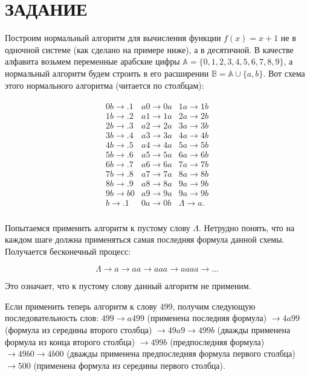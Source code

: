 \documentclass{article}
\begin{document}
\section*{ЗАДАНИЕ}
Построим нормальный алгоритм для вычисления функции \( f(x) = x + 1 \) не в одночной системе (как сделано на примере ниже), а в десятичной. В качестве алфавита возьмем переменные арабские цифры \( \mathbb{A} = \{0, 1, 2, 3, 4, 5, 6, 7, 8, 9\} \), а нормальный алгоритм будем строить в его расширении \( \mathbb{B} = \mathbb{A} \cup \{a, b\} \). Вот схема этого нормального алгоритма (читается по столбцам):

\begin{align*}
\begin{array}{lll}
0b \rightarrow .1 & a0 \rightarrow 0a & 1a \rightarrow 1b \\
1b \rightarrow .2 & a1 \rightarrow 1a & 2a \rightarrow 2b \\
2b \rightarrow .3 & a2 \rightarrow 2a & 3a \rightarrow 3b \\
3b \rightarrow .4 & a3 \rightarrow 3a & 4a \rightarrow 4b \\
4b \rightarrow .5 & a4 \rightarrow 4a & 5a \rightarrow 5b \\
5b \rightarrow .6 & a5 \rightarrow 5a & 6a \rightarrow 6b \\
6b \rightarrow .7 & a6 \rightarrow 6a & 7a \rightarrow 7b \\
7b \rightarrow .8 & a7 \rightarrow 7a & 8a \rightarrow 8b \\
8b \rightarrow .9 & a8 \rightarrow 8a & 9a \rightarrow 9b \\
9b \rightarrow b0 & a9 \rightarrow 9a & 9a \rightarrow 9b \\
b \rightarrow . 1 & 0a \rightarrow 0b & \Lambda \rightarrow a. \\ 
\end{array}
\end{align*}

Попытаемся применить алгоритм к пустому слову \( \Lambda \). Нетрудно понять, что на каждом шаге должна применяться самая последняя формула данной схемы. Получается бесконечный процесс:

\[
\Lambda \rightarrow a \rightarrow aa \rightarrow aaa \rightarrow aaaa \rightarrow \ldots
\]

Это означает, что к пустому слову данный алгоритм не применим.

Если применить теперь алгоритм к слову 499, получим следующую последовательность слов: $499 \rightarrow {a}499$ (применена последняя формула) $\rightarrow 4a99$ (формула из середины второго столбца) $\rightarrow 49a9 \rightarrow 499b$ (дважды применена формула из конца второго столбца) $\rightarrow 499b$ (предпоследняя формула) $\rightarrow 49b0 \rightarrow 4b00$ (дважды применена предпоследняя формула первого столбца) $\rightarrow 500$ (применена формула из середины первого столбца).
\end{document}
